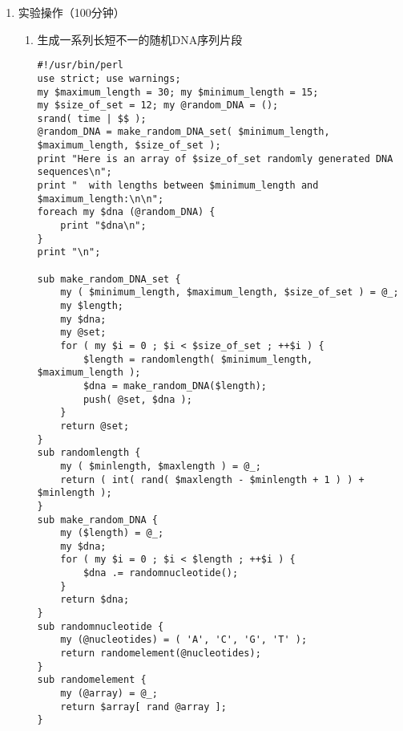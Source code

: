 \documentclass{TIJMUjiaoanSY}
\begin{document}
\firstTail

\newpage
\otherHeader

\begin{enumerate}
  \item 实验操作（100分钟）
    \begin{enumerate}
      \item 生成一系列长短不一的随机DNA序列片段
\begin{verbatim}
#!/usr/bin/perl
use strict; use warnings;
my $maximum_length = 30; my $minimum_length = 15;
my $size_of_set = 12; my @random_DNA = ();
srand( time | $$ );
@random_DNA = make_random_DNA_set( $minimum_length, $maximum_length, $size_of_set );
print "Here is an array of $size_of_set randomly generated DNA sequences\n";
print "  with lengths between $minimum_length and $maximum_length:\n\n";
foreach my $dna (@random_DNA) {
    print "$dna\n";
}
print "\n";

sub make_random_DNA_set {
    my ( $minimum_length, $maximum_length, $size_of_set ) = @_;
    my $length;
    my $dna;
    my @set;
    for ( my $i = 0 ; $i < $size_of_set ; ++$i ) {
        $length = randomlength( $minimum_length, $maximum_length );
        $dna = make_random_DNA($length);
        push( @set, $dna );
    }
    return @set;
}
sub randomlength {
    my ( $minlength, $maxlength ) = @_;
    return ( int( rand( $maxlength - $minlength + 1 ) ) + $minlength );
}
sub make_random_DNA {
    my ($length) = @_;
    my $dna;
    for ( my $i = 0 ; $i < $length ; ++$i ) {
        $dna .= randomnucleotide();
    }
    return $dna;
}
sub randomnucleotide {
    my (@nucleotides) = ( 'A', 'C', 'G', 'T' );
    return randomelement(@nucleotides);
}
sub randomelement {
    my (@array) = @_;
    return $array[ rand @array ];
}
\end{verbatim}

\otherTail
\newpage
\otherHeader


\end{enumerate}
\end{enumerate}
\end{document}

